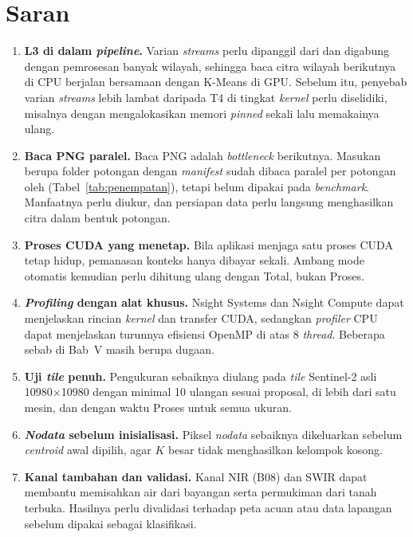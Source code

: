 \section{Saran}
\begin{enumerate}
    \item \textbf{L3 di dalam \emph{pipeline}.} Varian \emph{streams} perlu dipanggil dari  dan digabung dengan pemrosesan banyak wilayah, sehingga baca citra wilayah berikutnya di CPU berjalan bersamaan dengan K-Means di GPU. Sebelum itu, penyebab varian \emph{streams} lebih lambat daripada T4 di tingkat \emph{kernel} perlu diselidiki, misalnya dengan mengalokasikan memori \emph{pinned} sekali lalu memakainya ulang.
    \item \textbf{Baca PNG paralel.} Baca PNG adalah \emph{bottleneck} berikutnya. Masukan berupa folder potongan dengan \emph{manifest} sudah dibaca paralel per potongan oleh  (Tabel~\ref{tab:penempatan}), tetapi belum dipakai pada \emph{benchmark}. Manfaatnya perlu diukur, dan persiapan data perlu langsung menghasilkan citra dalam bentuk potongan.
    \item \textbf{Proses CUDA yang menetap.} Bila aplikasi menjaga satu proses CUDA tetap hidup, pemanasan konteks hanya dibayar sekali. Ambang mode otomatis kemudian perlu dihitung ulang dengan Total, bukan Proses.
    \item \textbf{\emph{Profiling} dengan alat khusus.} Nsight Systems dan Nsight Compute dapat menjelaskan rincian \emph{kernel} dan transfer CUDA, sedangkan \emph{profiler} CPU dapat menjelaskan turunnya efisiensi OpenMP di atas 8 \emph{thread}. Beberapa sebab di Bab~V masih berupa dugaan.
    \item \textbf{Uji \emph{tile} penuh.} Pengukuran sebaiknya diulang pada \emph{tile} Sentinel-2 asli 10980$\times$10980 dengan minimal 10 ulangan sesuai proposal, di lebih dari satu mesin, dan dengan waktu Proses untuk semua ukuran.
    \item \textbf{\emph{Nodata} sebelum inisialisasi.} Piksel \emph{nodata} sebaiknya dikeluarkan sebelum \emph{centroid} awal dipilih, agar $K$ besar tidak menghasilkan kelompok kosong.
    \item \textbf{Kanal tambahan dan validasi.} Kanal NIR (B08) dan SWIR dapat membantu memisahkan air dari bayangan serta permukiman dari tanah terbuka. Hasilnya perlu divalidasi terhadap peta acuan atau data lapangan sebelum dipakai sebagai klasifikasi.
\end{enumerate}

